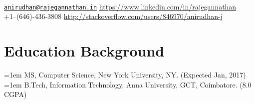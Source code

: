 \documentclass{resume}
\begin{document}
\\
{\href{mailto:anirudhan@rajegannathan.in}{\nolinkurl{anirudhan@rajegannathan.in}} \hfill \url{https://www.linkedin.com/in/rajegannathan}}\\
{+1--(646)-436-3808 \hfill \url{http://stackoverflow.com/users/846970/anirudhan-j}}

\section{Education Background}
\noindent \hangindent=1em  MS, Computer Science, New York University, NY. (Expected Jan, 2017)\\
\noindent \hangindent=1em  B.Tech, Information Technology, Anna University, GCT, Coimbatore. (8.0 CGPA)
\end{document}
